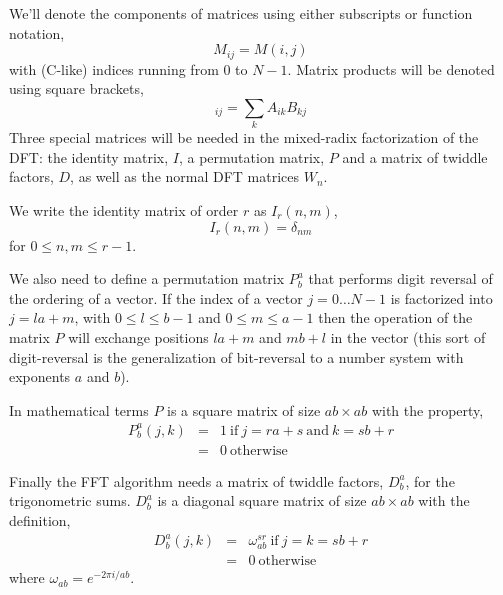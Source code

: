 \documentclass[fleqn,12pt]{article}
\begin{document}
We'll denote the components of matrices using either subscripts or
function notation,
%
\begin{equation}
M_{ij} = M(i,j)
\end{equation}
%
with (C-like) indices running from 0 to $N-1$.  Matrix products will be 
denoted using square brackets,
%
\begin{equation}
[AB]_{ij} = \sum_{k} A_{ik} B_{kj}
\end{equation}
%
%
Three special matrices will be needed in the mixed-radix factorization
of the DFT: the identity matrix, $I$, a permutation matrix, $P$ and a
matrix of twiddle factors, $D$, as well as the normal DFT matrices
$W_n$.

We write the identity matrix of order $r$ as $I_r(n,m)$,
%
\begin{equation}
I_r(n,m) = \delta_{nm}
\end{equation}
%
for $0 \leq n,m \leq r-1$.

We also need to define a permutation matrix $P^a_b$ that performs
digit reversal of the ordering of a vector. If the index of a vector
$j= 0\dots N-1$ is factorized into $j = la +m$, with $0 \leq l \leq
b-1$ and $0 \leq m \leq a-1$ then the operation of the matrix $P$ will
exchange positions $la+m$ and $mb+l$ in the vector (this sort of
digit-reversal is the generalization of bit-reversal to a number
system with exponents $a$ and $b$).

In mathematical terms $P$ is a square matrix of size $ab \times ab$
with the property,
%
\begin{eqnarray}
P^a_b(j,k) &=& 1 ~\mbox{if}~ j=ra+s ~\mbox{and}~ k=sb+r \\
           &=& 0 ~\mbox{otherwise}
\end{eqnarray}
%

Finally the FFT algorithm needs a matrix of twiddle factors, $D^a_b$,
for the trigonometric sums. $D^a_b$ is a diagonal square matrix of
size $ab \times ab$ with the definition,
%
\begin{eqnarray}
D^a_b(j,k) &=& \omega^{sr}_{ab} ~\mbox{if}~ j=k=sb+r \\
           &=& 0 ~\mbox{otherwise}
\end{eqnarray}
%
where $\omega_{ab} = e^{-2\pi i/ab}$.
\end{document}

